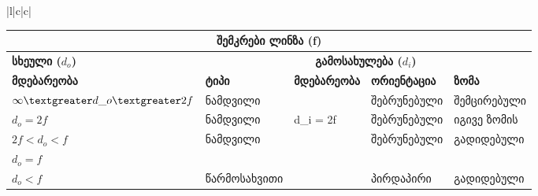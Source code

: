 \documentclass{book}
\begin{document}
\begin{tabular}{|l|c|c|}
\begin{table}[]
\begin{tabular}{|lllll|}
\hline
\multicolumn{5}{|c|}{\textbf{შემკრები ლინზა (f)}}                                                                                                                                                                        \\ \hline
\multicolumn{1}{|l|}{\textbf{სხეული ($d_o$)}}                                 & \multicolumn{4}{c|}{\textbf{გამოსახულება ($d_i$)}}                                                                                       \\ \hline
\multicolumn{1}{|l|}{\textbf{მდებარეობა}}                                     & \multicolumn{1}{l|}{\textbf{ტიპი}} & \multicolumn{1}{l|}{\textbf{მდებარეობა}} & \multicolumn{1}{l|}{\textbf{ორიენტაცია}} & \textbf{ზომა} \\ \hline
\multicolumn{1}{|l|}{$\infty \textgreater d\_o \textgreater 2f$} & \multicolumn{1}{l|}{ნამდვილი}      & \multicolumn{1}{l|}{}                    & \multicolumn{1}{l|}{შებრუნებული}         & შემცირებული   \\ \hline
\multicolumn{1}{|l|}{$d_o = 2f$}                                               & \multicolumn{1}{l|}{ნამდვილი}      & \multicolumn{1}{l|}{d\_i = 2f}           & \multicolumn{1}{l|}{შებრუნებული}         & იგივე ზომის   \\ \hline
\multicolumn{1}{|l|}{$2f < d_o < f$}                           & \multicolumn{1}{l|}{ნამდვილი}      & \multicolumn{1}{l|}{}                    & \multicolumn{1}{l|}{შებრუნებული}         & გადიდებული    \\ \hline
\multicolumn{1}{|l|}{$d_o = f$}                                                & \multicolumn{1}{l|}{}              & \multicolumn{1}{l|}{}                    & \multicolumn{1}{l|}{}                    &               \\ \hline
\multicolumn{1}{|l|}{$d_o < f$}                                        & \multicolumn{1}{l|}{წარმოსახვითი}  & \multicolumn{1}{l|}{}                    & \multicolumn{1}{l|}{პირდაპირი}           & გადიდებული    \\ \hline
\end{tabular}
\end{table}


\end{tabular}
\end{document}
